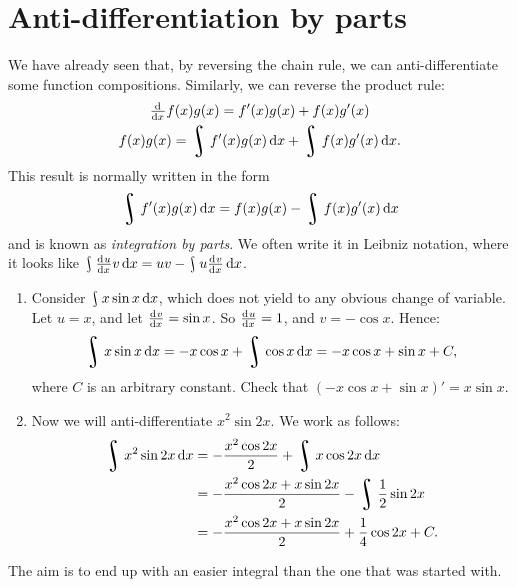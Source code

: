 \section{Anti-differentiation by parts}
We have already seen that, by reversing the chain rule, we can anti-differentiate
some function compositions. Similarly, we can reverse the product rule:
\begin{gather*}
  \od{}{x} f(x) g(x) = f'(x) g(x) + f(x) g'(x)\\
  f(x) g(x) = \rint f'(x) g(x) \dif{x} + \rint f(x) g'(x) \dif{x}.
\end{gather*}
This result is normally written in the form
\begin{equation}
  \rint f'(x) g(x) \dif{x} = f(x) g(x) - \rint f(x) g'(x) \dif{x}
\end{equation}
and is known as \emph{integration by parts}. We often write it in Leibniz notation,
where it looks like $ \rint \od{u}{x} v \dif{x} = uv - \rint u \od{v}{x} \dif{x} $.

\begin{exs}
  \begin{enumerate}
    \item Consider $ \rint x \sin x \dif{x} $, which does not yield to any obvious change of variable. Let $ u = x $, and
          let $ \od{v}{x} = \sin x $. So $ \od{u}{x} = 1 $, and $ v = -\cos x $. Hence:
          \begin{displaymath}
            \rint x \sin x \dif{x} = -x\cos x + \rint \cos x \dif{x} = -x\cos x + \sin x + C,
          \end{displaymath}
          where $ C $ is an arbitrary constant. Check that $ (-x\cos x + \sin x)' = x\sin x $.
    \item Now we will anti-differentiate $ x^2 \sin 2x $. We work as follows:
          \begin{align*}
            \rint x^2 \sin 2x \dif{x} &= -\frac{x^2 \cos 2x}{2} + \rint x \cos 2x \dif{x}\\
                                      &= -\frac{x^2 \cos 2x + x \sin 2x}{2} - \rint \frac{1}{2} \sin 2x\\
                                      &= -\frac{x^2 \cos 2x + x \sin 2x}{2} + \frac{1}{4} \cos 2x + C.
          \end{align*}
  \end{enumerate}
\end{exs}

The aim is to end up with an easier integral than the one that was started with.

